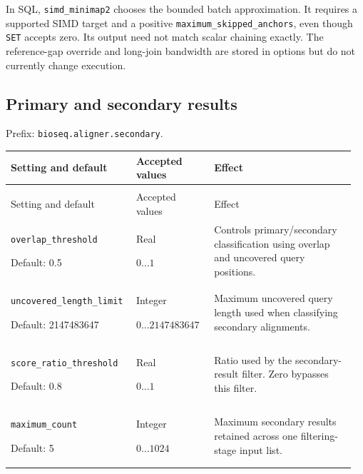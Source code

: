 In SQL, \texttt{simd\_minimap2} chooses the bounded batch approximation. It
requires a supported SIMD target and a positive
\texttt{maximum\_skipped\_anchors}, even though \texttt{SET} accepts zero.
Its output need not match scalar chaining exactly. The reference-gap override
and long-join bandwidth are stored in options but do not currently change
execution.

\subsection{Primary and secondary results}

Prefix: \nolinkurl{bioseq.aligner.secondary}.

\begingroup
\small
\setlength{\tabcolsep}{4pt}
\renewcommand{\arraystretch}{1.16}
\begin{longtable}{@{}>{\raggedright\arraybackslash}p{0.34\linewidth}>{\raggedright\arraybackslash}p{0.22\linewidth}>{\raggedright\arraybackslash}p{0.40\linewidth}@{}}
\toprule
Setting and default & Accepted values & Effect \\
\midrule
\endfirsthead
\multicolumn{3}{@{}l}{Prefix: \nolinkurl{bioseq.aligner.secondary} (continued)} \\
\toprule
Setting and default & Accepted values & Effect \\
\midrule
\endhead
\bottomrule
\endfoot
\nolinkurl{overlap_threshold}\par Default: 0.5 & Real\par $0\ldots 1$ & Controls primary/secondary classification using overlap and uncovered query positions. \\[4pt]
\nolinkurl{uncovered_length_limit}\par Default: 2147483647 & Integer\par $0\ldots 2147483647$ & Maximum uncovered query length used when classifying secondary alignments. \\[4pt]
\nolinkurl{score_ratio_threshold}\par Default: 0.8 & Real\par $0\ldots 1$ & Ratio used by the secondary-result filter. Zero bypasses this filter. \\[4pt]
\nolinkurl{maximum_count}\par Default: 5 & Integer\par $0\ldots 1024$ & Maximum secondary results retained across one filtering-stage input list. \\[4pt]
\end{longtable}
\endgroup

